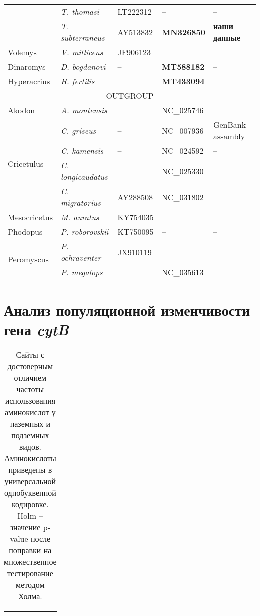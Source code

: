 \begin{landscape}
\begin{center}
\begin{longtable}{|p{3.5cm}|p{4.5cm}|p{4.0cm}|p{6.5cm}|p{4.5cm}|}
& \textit{T. thomasi} & LT222312 & -- & --\\ \cline{2-5}
& \textit{T. subterraneus} & AY513832 & \textbf{MN326850} & \textbf{наши данные}\\ \hline
Volemys & \textit{V. millicens} & JF906123 & -- & --\\ \hline
Dinaromys & \textit{D. bogdanovi} & -- & \textbf{MT588182} & --\\ \hline
Hyperacrius & \textit{H. fertilis} & -- & \textbf{MT433094} & --\\ \hline
\multicolumn{5}{|c|}{OUTGROUP} \\ \hline
Akodon & \textit{A. montensis} & -- & NC\_025746 & --\\ \hline
\multirow{4}{*}{Cricetulus} & \textit{C. griseus} & -- & NC\_007936 & GenBank assambly\\ \cline{2-5}
& \textit{C. kamensis} & -- & NC\_024592 & --\\ \cline{2-5}
& \textit{C. longicaudatus} & -- & NC\_025330 & --\\ \cline{2-5}
& \textit{C. migratorius} & AY288508 & NC\_031802 & --\\ \hline
Mesocricetus & \textit{M. auratus} & KY754035 & -- & --\\ \hline
Phodopus & \textit{P. roborovskii} & KT750095 & -- & --\\ \hline
\multirow{2}{*}{Peromyscus} & \textit{P. ochraventer} &  JX910119 & -- & --\\ \cline{2-5}
& \textit{P. megalops} & -- & NC\_035613 & --\\ \hline


\end{longtable}

\end{center}


\chapter{Анализ популяционной изменчивости гена \textit{cytB}}

\begin{longtable}{|l|l|p{10.5cm}|p{10.5cm}|}
	\caption{Сайты с достоверным отличием частоты использования аминокислот у наземных и подземных видов. Аминокислоты приведены в универсальной однобуквенной кодировке. Holm – значение p-value после поправки на множественное тестирование методом Холма.} \label{BigTable} \vspace{5mm} \\
	

\end{longtable}
\end{landscape}
